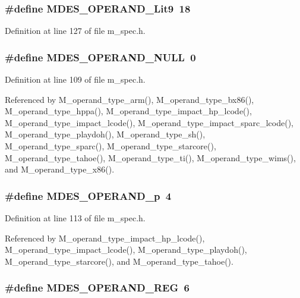 \subsubsection{\setlength{\rightskip}{0pt plus 5cm}\#define MDES\_\-OPERAND\_\-Lit9~18}\label{m__spec_8h_dd44d88a8c2374cbf88d216a2cc59238}




Definition at line 127 of file m\_\-spec.h.
\subsubsection{\setlength{\rightskip}{0pt plus 5cm}\#define MDES\_\-OPERAND\_\-NULL~0}\label{m__spec_8h_bd16e7c5b5cec05518c1e0ade0daf6f1}




Definition at line 109 of file m\_\-spec.h.

Referenced by M\_\-operand\_\-type\_\-arm(), M\_\-operand\_\-type\_\-bx86(), M\_\-operand\_\-type\_\-hppa(), M\_\-operand\_\-type\_\-impact\_\-hp\_\-lcode(), M\_\-operand\_\-type\_\-impact\_\-lcode(), M\_\-operand\_\-type\_\-impact\_\-sparc\_\-lcode(), M\_\-operand\_\-type\_\-playdoh(), M\_\-operand\_\-type\_\-sh(), M\_\-operand\_\-type\_\-sparc(), M\_\-operand\_\-type\_\-starcore(), M\_\-operand\_\-type\_\-tahoe(), M\_\-operand\_\-type\_\-ti(), M\_\-operand\_\-type\_\-wims(), and M\_\-operand\_\-type\_\-x86().
\subsubsection{\setlength{\rightskip}{0pt plus 5cm}\#define MDES\_\-OPERAND\_\-p~4}\label{m__spec_8h_c19b27c459c1f9813825a9bbb12384bb}




Definition at line 113 of file m\_\-spec.h.

Referenced by M\_\-operand\_\-type\_\-impact\_\-hp\_\-lcode(), M\_\-operand\_\-type\_\-impact\_\-lcode(), M\_\-operand\_\-type\_\-playdoh(), M\_\-operand\_\-type\_\-starcore(), and M\_\-operand\_\-type\_\-tahoe().
\subsubsection{\setlength{\rightskip}{0pt plus 5cm}\#define MDES\_\-OPERAND\_\-REG~6}\label{m__spec_8h_74b200a841f23086047cd2dc15674b31}




